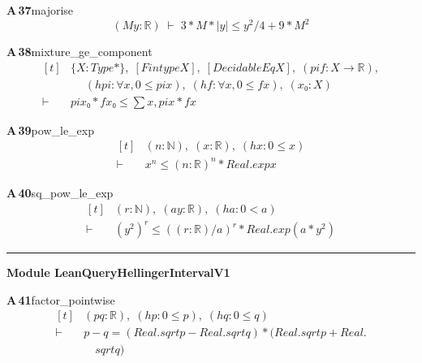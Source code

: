 \documentclass[conference]{IEEEtran}
\theoremstyle{definition}
\newcommand{\lean}[1]{\textsf{\footnotesize #1}}
\begin{document}
\noindent\textbf{A\,37}\quad\lean{majorise}
{\footnotesize\[ (\mathit{M} \mathit{y} : \mathbb{R} ) \;\vdash\; 3 * \mathit{M} * |\mathit{y}| \leq \mathit{y} ^{2} / 4 + 9 * \mathit{M} ^{2} \]}

\noindent\textbf{A\,38}\quad\lean{mixture\_ge\_component}
{\footnotesize\[ \begin{aligned}[t]
&\{ \mathit{X} : \mathit{Type}*\},\; [\mathit{Fintype} \mathit{X}],\; [\mathit{DecidableEq} \mathit{X}],\; (\mathit{pi} \mathit{f} : \mathit{X} \to \mathbb{R} ),\\
&\quad \; (\mathit{hpi} : \forall \mathit{x}, 0 \leq \mathit{pi} \mathit{x}),\; (\mathit{hf} : \forall \mathit{x}, 0 \leq \mathit{f} \mathit{x}),\; (\mathit{x₀} : \mathit{X})\\
\vdash\;&\mathit{pi} \mathit{x₀} * \mathit{f} \mathit{x₀} \leq \textstyle\sum \mathit{x}, \mathit{pi} \mathit{x} * \mathit{f} \mathit{x}
\end{aligned} \]}

\noindent\textbf{A\,39}\quad\lean{pow\_le\_exp}
{\footnotesize\[ \begin{aligned}[t]
&(\mathit{n} : \mathbb{N} ),\; (\mathit{x} : \mathbb{R} ),\; (\mathit{hx} : 0 \leq \mathit{x})\\
\vdash\;&\mathit{x} ^{\mathit{n}} \leq (\mathit{n} : \mathbb{R} ) ^{\mathit{n}} * \mathit{Real}.\mathit{exp} \mathit{x}
\end{aligned} \]}

\noindent\textbf{A\,40}\quad\lean{sq\_pow\_le\_exp}
{\footnotesize\[ \begin{aligned}[t]
&(\mathit{r} : \mathbb{N} ),\; (\mathit{a} \mathit{y} : \mathbb{R} ),\; (\mathit{ha} : 0 < \mathit{a})\\
\vdash\;&(\mathit{y} ^{2}) ^{\mathit{r}} \leq ((\mathit{r} : \mathbb{R} ) / \mathit{a}) ^{\mathit{r}} * \mathit{Real}.\mathit{exp} (\mathit{a} * \mathit{y} ^{2})
\end{aligned} \]}

\vspace{4pt}\noindent\rule{\columnwidth}{0.4pt}\par\vspace{2pt}
\noindent\textbf{Module \lean{LeanQueryHellingerIntervalV1}}\par\vspace{3pt}

\noindent\textbf{A\,41}\quad\lean{factor\_pointwise}
{\footnotesize\[ \begin{aligned}[t]
&(\mathit{p} \mathit{q} : \mathbb{R} ),\; (\mathit{hp} : 0 \leq \mathit{p}),\; (\mathit{hq} : 0 \leq \mathit{q})\\
\vdash\;&\mathit{p} - \mathit{q} = (\mathit{Real}.\mathit{sqrt} \mathit{p} - \mathit{Real}.\mathit{sqrt} \mathit{q}) * (\mathit{Real}.\mathit{sqrt} \mathit{p} + \mathit{Real}.\\
&\quad \mathit{sqrt} \mathit{q})
\end{aligned} \]}
\end{document}
